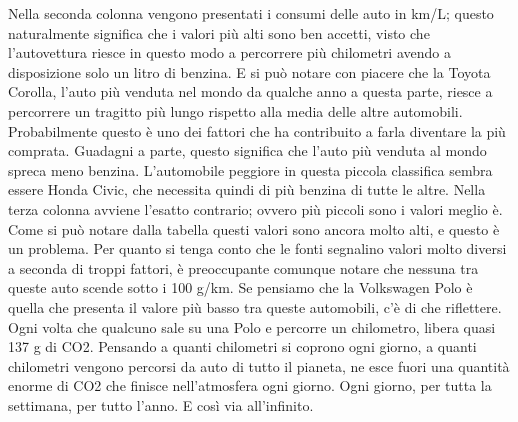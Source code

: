 Nella seconda colonna vengono presentati i consumi delle auto in km/L; questo naturalmente significa che i valori più alti sono ben accetti, visto che l’autovettura riesce in questo modo a percorrere più chilometri avendo a disposizione solo un litro di benzina. E si può notare con piacere che la Toyota Corolla, l’auto più venduta nel mondo da qualche anno a questa parte, riesce a percorrere un tragitto più lungo rispetto alla media delle altre automobili. Probabilmente questo è uno dei fattori che ha contribuito a farla diventare la più comprata. Guadagni a parte, questo significa che l’auto più venduta al mondo spreca meno benzina. L’automobile peggiore in questa piccola classifica sembra essere Honda Civic, che necessita quindi di più benzina di tutte le altre. 
Nella terza colonna avviene l’esatto contrario; ovvero più piccoli sono i valori meglio è. Come si può notare dalla tabella questi valori sono ancora molto alti, e questo è un problema. Per quanto si tenga conto che le fonti segnalino valori molto diversi a seconda di troppi fattori, è preoccupante comunque notare che nessuna tra queste auto scende sotto i 100 g/km. Se pensiamo che la Volkswagen Polo è quella che presenta il valore più basso tra queste automobili, c’è di che riflettere. Ogni volta che qualcuno sale su una Polo e percorre un chilometro, libera quasi 137 g di CO2. Pensando a quanti chilometri si coprono ogni giorno, a quanti chilometri vengono percorsi da auto di tutto il pianeta, ne esce fuori una quantità enorme di CO2 che finisce nell’atmosfera ogni giorno. Ogni giorno, per tutta la settimana, per tutto l’anno. E così via all’infinito. 
